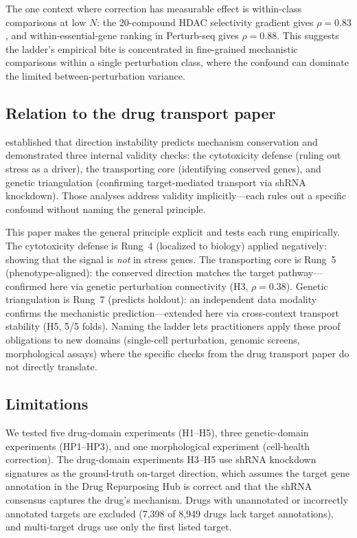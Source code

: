 \documentclass{article}
\begin{document}
The one context where correction has measurable effect is within-class
comparisons at low $N$: the 20-compound HDAC selectivity gradient gives
$\rho = 0.83$, and within-essential-gene ranking in Perturb-seq gives $\rho
= 0.88$. This suggests the ladder's empirical bite is concentrated in
fine-grained mechanistic comparisons within a single perturbation class,
where the confound can dominate the limited between-perturbation variance.

\subsection{Relation to the drug transport paper}

\citet{tower2026bracket} established that direction instability predicts mechanism
conservation and demonstrated three internal validity checks: the cytotoxicity
defense (ruling out stress as a driver), the transporting core (identifying
conserved genes), and genetic triangulation (confirming target-mediated
transport via shRNA knockdown). Those analyses address validity implicitly---each
rules out a specific confound without naming the general principle.

This paper makes the general principle explicit and tests each rung
empirically. The cytotoxicity defense is
Rung~4 (localized to biology) applied negatively: showing that the signal is
\emph{not} in stress genes. The transporting core is Rung~5 (phenotype-aligned):
the conserved direction matches the target pathway---confirmed here via
genetic perturbation connectivity (H3, $\rho = 0.38$). Genetic triangulation is
Rung~7 (predicts holdout): an independent data modality confirms the mechanistic
prediction---extended here via cross-context transport stability (H5, 5/5
folds). Naming the ladder lets practitioners apply these proof obligations
to new domains (single-cell perturbation, genomic screens, morphological
assays) where the specific checks from the drug transport paper do not
directly translate.

\subsection{Limitations}

We tested five drug-domain experiments (H1--H5), three genetic-domain
experiments (HP1--HP3), and one morphological experiment (cell-health
correction). The drug-domain experiments H3--H5 use shRNA knockdown
signatures as the ground-truth on-target direction, which assumes the
target gene annotation in the Drug Repurposing Hub is correct and that
the shRNA consensus captures the drug's mechanism. Drugs with
unannotated or incorrectly annotated targets are excluded (7{,}398 of
8{,}949 drugs lack target annotations), and multi-target drugs use only
the first listed target.
\end{document}
